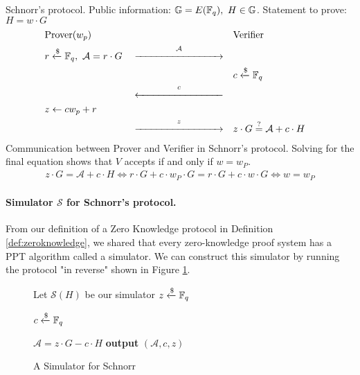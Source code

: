 \begin{protocol}[label={prot:schnorr}]{Schnorr's protocol. Public information: $\mathbb{G} = E(\mathbb{F}_q),\ H \in \mathbb{G}$. Statement to prove: $H = w \cdot G$} 
    \vspace{-0.5cm}
    \begin{align*}
        &\text{Prover}(w_p)& 
        &&
        &\text{Verifier}& 
        \\
        &r \samplefrom \F_q,\ \mathcal A = r \cdot G&
        &\overset  {\mathcal A} {\xrightarrow{\hspace{3cm}}}&
        && 
        \\
        &&
        &&
        &c \samplefrom \F_q&
        \\
        &&
        &\overset c {\xleftarrow{\hspace{3cm}}}&
        &&
        \\
        &z \leftarrow cw_p + r&
        &&
        && 
        \\
        &&
        &\overset {z} {\xrightarrow{\hspace{3cm}}}&
        &z \cdot G \verify \mathcal A + c \cdot H&
    \end{align*}
    \tcblower
    Communication between Prover and Verifier in Schnorr's protocol. Solving for the final equation shows  that $V$ accepts if and only if $w = w_P$.
    $$
    \begin{gathered}
    z \cdot G = \mathcal A + c \cdot H \iff
    r \cdot G + c \cdot w_P \cdot G  = r \cdot G + c \cdot w \cdot G \iff
    w  =  w_P
    \end{gathered}
    $$
\end{protocol}



\paragraph{Simulator $\mathcal S$ for Schnorr's protocol.} From our definition of a Zero Knowledge protocol in Definition 
\ref{def:zeroknowledge}, we shared that every zero-knowledge proof system has a PPT algorithm called a simulator. We can construct this simulator by running the protocol "in reverse" shown in Figure \ref{fig:schnorr-sim}.

\begin{figure}[h]
    \centering
    \begin{problem}[width=\linewidth/2]{Let $\mathcal S(H)$ be our simulator}
        $z \xleftarrow{\$} \mathbb{F}_q$ 
        
        $c \xleftarrow{\$} \mathbb{F}_q$
        
        $\mathcal A = z \cdot G - c \cdot H$
        \tcblower
        \textbf{output} $(\mathcal A,c,z)$
    \end{problem}
    \caption{A Simulator for Schnorr}
    \label{fig:schnorr-sim}
\end{figure}

